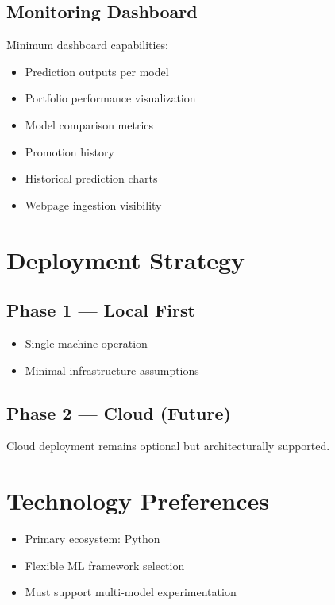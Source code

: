 \documentclass[11pt]{article}
\begin{document}
\subsection*{Monitoring Dashboard}

Minimum dashboard capabilities:

\begin{itemize}
\item Prediction outputs per model
\item Portfolio performance visualization
\item Model comparison metrics
\item Promotion history
\item Historical prediction charts
\item Webpage ingestion visibility
\end{itemize}

\section*{Deployment Strategy}

\subsection*{Phase 1 --- Local First}

\begin{itemize}
\item Single-machine operation
\item Minimal infrastructure assumptions
\end{itemize}

\subsection*{Phase 2 --- Cloud (Future)}

Cloud deployment remains optional but architecturally supported.

\section*{Technology Preferences}

\begin{itemize}
\item Primary ecosystem: Python
\item Flexible ML framework selection
\item Must support multi-model experimentation
\end{itemize}
\end{document}
